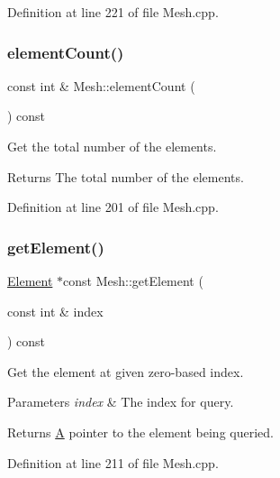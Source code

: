 Definition at line 221 of file Mesh.\+cpp.

\mbox{\label{class_mesh_aa1b2aafa40bd4b335e9bf6306e482881}} 
\subsubsection{\texorpdfstring{element\+Count()}{elementCount()}}
{\footnotesize\ttfamily const int \& Mesh\+::element\+Count (\begin{DoxyParamCaption}{ }\end{DoxyParamCaption}) const}



Get the total number of the elements. 

\begin{DoxyReturn}{Returns}
The total number of the elements. 
\end{DoxyReturn}


Definition at line 201 of file Mesh.\+cpp.

\mbox{\label{class_mesh_ada2ae7b8640a3999780d7e738ee4154e}} 
\subsubsection{\texorpdfstring{get\+Element()}{getElement()}}
{\footnotesize\ttfamily \mbox{\hyperlink{class_element}{Element}} $\ast$const Mesh\+::get\+Element (\begin{DoxyParamCaption}\item[{const int \&}]{index }\end{DoxyParamCaption}) const}



Get the element at given zero-\/based index. 


\begin{DoxyParams}{Parameters}
{\em index} & The index for query. \\
\hline
\end{DoxyParams}
\begin{DoxyReturn}{Returns}
\mbox{\hyperlink{class_a}{A}} pointer to the element being queried. 
\end{DoxyReturn}


Definition at line 211 of file Mesh.\+cpp.

